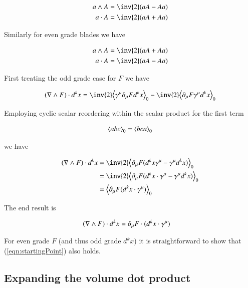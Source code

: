 \begin{align*}
a \wedge A = \inv{2} (a A - A a) \\
a \cdot A = \inv{2} (a A + A a)
\end{align*}

Similarly for even grade blades we have

\begin{align*}
a \wedge A = \inv{2} (a A + A a) \\
a \cdot A = \inv{2} (a A - A a)
\end{align*}

First treating the odd grade case for $F$ we have

\begin{align*}
( \grad \wedge F ) \cdot d^k x
&=
\inv{2} \gpgradezero{ \gamma^\mu \partial_\mu F d^k x } - \inv{2} \gpgradezero{ \partial_\mu F \gamma^\mu d^k x } \\
\end{align*}

Employing cyclic scalar reordering within the scalar product for the first term

\begin{align}
{\left\langle{{a b c}}\right\rangle}_{0} = {\left\langle{{b c a}}\right\rangle}_{0}
\end{align}

we have

\begin{align*}
( \grad \wedge F ) \cdot d^k x
&=
\inv{2} \gpgradezero{ \partial_\mu F (d^k x \gamma^\mu - \gamma^\mu d^k x)} \\
&=
\inv{2} \gpgradezero{ \partial_\mu F (d^k x \cdot \gamma^\mu - \gamma^\mu d^k x)} \\
&=
\gpgradezero{ \partial_\mu F (d^k x \cdot \gamma^\mu)} \\
\end{align*}

The end result is 

\begin{align}\label{eqn:startingPoint}
( \nabla \wedge F ) \cdot d^k x &= \partial_\mu F \cdot (d^k x \cdot \gamma^\mu) 
\end{align}

For even grade $F$ (and thus odd grade $d^k x$) it is straightforward to show that (\ref{eqn:startingPoint}) also holds.

\subsection{Expanding the volume dot product}

